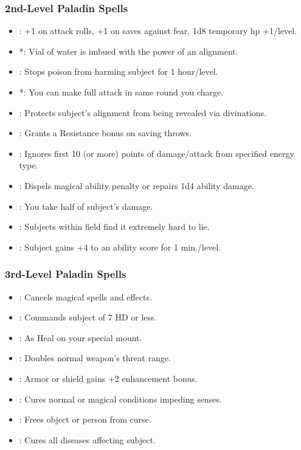 \subsubsection{2nd-Level Paladin Spells}
\begin{itemize}
\item {}: +1 on attack rolls, +1 on saves against fear, 1d8 temporary hp +1/level.
\item {}*: Vial of water is imbued with the power of an alignment.
\item {}: Stops poison from harming subject for 1 hour/level.
\item {}*: You can make full attack in same round you charge.
\item {}: Protects subject's alignment from being revealed via divinations.
\item {}: Grants a Resistance bonus on saving throws.
\item {}: Ignores first 10 (or more) points of damage/attack from specified energy type.
\item {}: Dispels magical ability penalty or repairs 1d4 ability damage.
\item {}: You take half of subject's damage.
\item {}: Subjects within field find it extremely hard to lie.
\item {}: Subject gains +4 to an ability score for 1 min./level.
\end{itemize}
\subsubsection{3rd-Level Paladin Spells}
\begin{itemize}
 \item {}: Cancels magical spells and effects.
 \item {}: Commands subject of 7 HD or less.
 \item {}: As Heal on your special mount.
 \item {}: Doubles normal weapon's threat range.
 \item {}: Armor or shield gains +2 enhancement bonus.
 \item {}: Cures normal or magical conditions impeding senses.
 \item {}: Frees object or person from curse.
 \item {}: Cures all diseases affecting subject.
\end{itemize}

